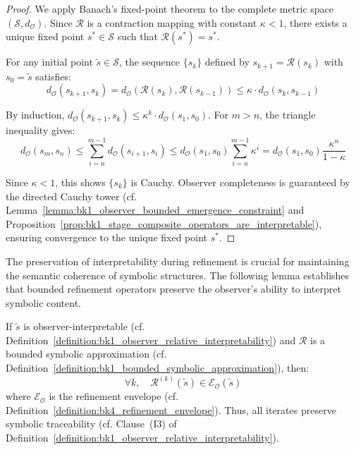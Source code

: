 \begin{proof}
We apply Banach's fixed-point theorem to the complete metric space $(\mathcal{S}, d_{\mathcal{O}})$. Since $\mathcal{R}$ is a contraction mapping with constant $\kappa < 1$, there exists a unique fixed point $s^* \in \mathcal{S}$ such that $\mathcal{R}(s^*) = s^*$. 

For any initial point $\tilde{s} \in \mathcal{S}$, the sequence $\{s_k\}$ defined by $s_{k+1} = \mathcal{R}(s_k)$ with $s_0 = \tilde{s}$ satisfies:
\[
d_{\mathcal{O}}(s_{k+1}, s_k) = d_{\mathcal{O}}(\mathcal{R}(s_k), \mathcal{R}(s_{k-1})) \le \kappa \cdot d_{\mathcal{O}}(s_k, s_{k-1})
\]

By induction, $d_{\mathcal{O}}(s_{k+1}, s_k) \le \kappa^k \cdot d_{\mathcal{O}}(s_1, s_0)$. For $m > n$, the triangle inequality gives:
\[
d_{\mathcal{O}}(s_m, s_n) \le \sum_{i=n}^{m-1} d_{\mathcal{O}}(s_{i+1}, s_i) \le d_{\mathcal{O}}(s_1, s_0) \sum_{i=n}^{m-1} \kappa^i = d_{\mathcal{O}}(s_1, s_0) \frac{\kappa^n}{1-\kappa}
\]

Since $\kappa < 1$, this shows $\{s_k\}$ is Cauchy. Observer completeness is guaranteed by the directed Cauchy tower (cf. Lemma~\ref{lemma:bk1_observer_bounded_emergence_constraint} and Proposition~\ref{prop:bk1_stage_composite_operators_are_interpretable}), ensuring convergence to the unique fixed point $s^*$.
\end{proof}

The preservation of interpretability during refinement is crucial for maintaining the semantic coherence of symbolic structures. The following lemma establishes that bounded refinement operators preserve the observer's ability to interpret symbolic content.

\begin{lemma}
\label{lemma:bk4_ttpr_interpretability_preserved}
If $\tilde{s}$ is observer-interpretable (cf. Definition~\ref{definition:bk1_observer_relative_interpretability}) and $\mathcal{R}$ is a bounded symbolic approximation (cf. Definition~\ref{definition:bk1_bounded_symbolic_approximation}), then:
\[
\forall k,\quad \mathcal{R}^{(k)}(\tilde{s}) \in \mathcal{E}_{\mathcal{O}}(\tilde{s})
\]
where $\mathcal{E}_{\mathcal{O}}$ is the refinement envelope (cf. Definition~\ref{definition:bk4_refinement_envelope}). Thus, all iterates preserve symbolic traceability (cf. Clause~(I3) of Definition~\ref{definition:bk1_observer_relative_interpretability}).
\end{lemma}

